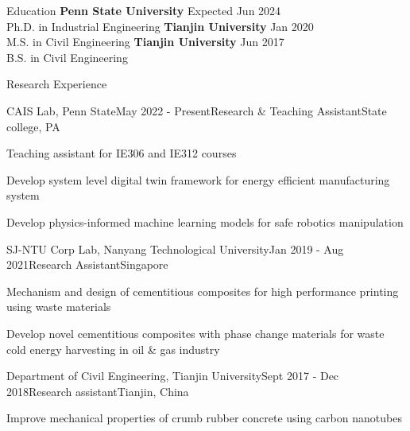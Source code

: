 \documentclass{resume}
\begin{document}

\begin{rSection}{Education}
{\bf Penn State University} \hfill {Expected Jun 2024} \\ 
Ph.D. in Industrial Engineering
{\bf Tianjin University} \hfill {Jan 2020}\\
M.S. in Civil Engineering
{\bf Tianjin University} \hfill {Jun 2017}\\
B.S. in Civil Engineering
\end{rSection}

\begin{rSection}{Research Experience}

\begin{rSubsection}{CAIS Lab, Penn State}{May 2022 - Present}{Research \& Teaching Assistant}{State college, PA}
\item Teaching assistant for IE306 and IE312 courses
\item Develop system level digital twin framework for energy efficient manufacturing system
\item Develop physics-informed machine learning models for safe robotics manipulation
\end{rSubsection}
        
\begin{rSubsection}{SJ-NTU Corp Lab, Nanyang Technological University}{Jan 2019 - Aug 2021}{Research Assistant}{Singapore}
\item Mechanism and design of cementitious composites for high performance printing using waste materials
\item Develop novel cementitious composites with phase change materials for waste cold energy harvesting in oil \& gas industry
\end{rSubsection}
        
\begin{rSubsection}{Department of Civil Engineering, Tianjin University}{Sept 2017 - Dec 2018}{Research assistant}{Tianjin, China}
\item Improve mechanical properties of crumb rubber concrete using carbon nanotubes
\end{rSubsection}
        
\end{rSection}
\end{document}
